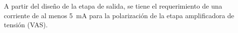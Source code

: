 A partir del diseño de la etapa de salida, se tiene el requerimiento de una corriente de al menos \SI{5}{\milli\ampere} para la polarización de la etapa amplificadora de tensión (VAS).

